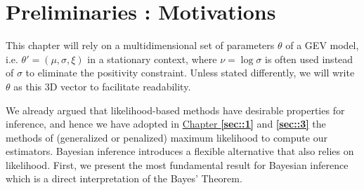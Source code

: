 \section{Preliminaries : Motivations}\label{sec:bayprelim}


This chapter will rely on a	 multidimensional set of parameters $\theta$ of a GEV model, i.e. $\theta'=(\mu,\sigma,\xi)$ in a stationary context, where $\nu=\log \sigma$ is often used instead of $\sigma$ to eliminate the positivity constraint.
 Unless stated differently, we will write $\theta$ as this $3$D vector to facilitate readability.
 
We already argued that likelihood-based methods have desirable properties for inference, and hence we have adopted in \hyperref[sec::1]{Chapter \textbf{\ref{sec::1}}} and \textbf{\ref{sec::3}} the methods of (generalized or penalized) maximum likelihood to compute our estimators. Bayesian inference introduces a flexible alternative that also relies on likelihood. First, we present the most fundamental result for Bayesian inference which is a direct interpretation of the Bayes' Theorem.

